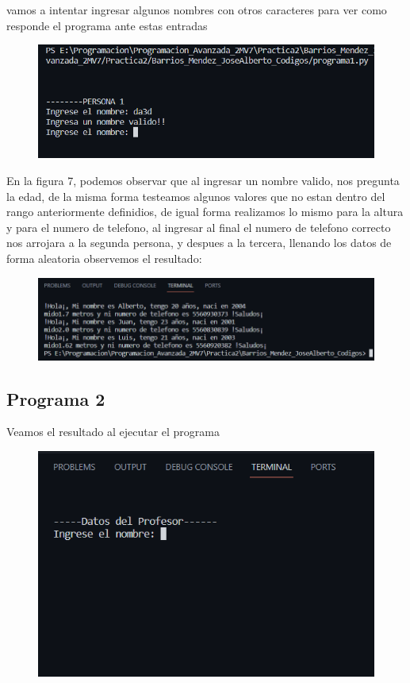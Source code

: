 \documentclass[12pt]{article}
\begin{document}
vamos a intentar ingresar algunos nombres con otros caracteres para ver como responde el programa ante estas entradas

\begin{figure}[H]
		\begin{center}
 			\includegraphics[width = .8\textwidth]{08.png}
 			
		\end{center} 
\end{figure}

En la figura 7, podemos observar que al ingresar un nombre valido, nos pregunta la edad, de la misma forma testeamos algunos valores que no estan dentro del rango anteriormente definidios, de igual forma realizamos lo mismo para la altura y para el numero de telefono, al ingresar al final el numero de telefono correcto nos arrojara a la segunda persona, y despues a la tercera, llenando los datos de forma aleatoria observemos el resultado: 


\begin{figure}[H]
		\begin{center}
 			\includegraphics[width = .8\textwidth]{10.png}
 			
		\end{center} 
\end{figure}
\subsection{Programa 2}
Veamos el resultado al ejecutar el programa

\begin{figure}[H]
		\begin{center}
 			\includegraphics[width = .4\textwidth]{13.png}
 			
		\end{center} 
\end{figure}
\end{document}
